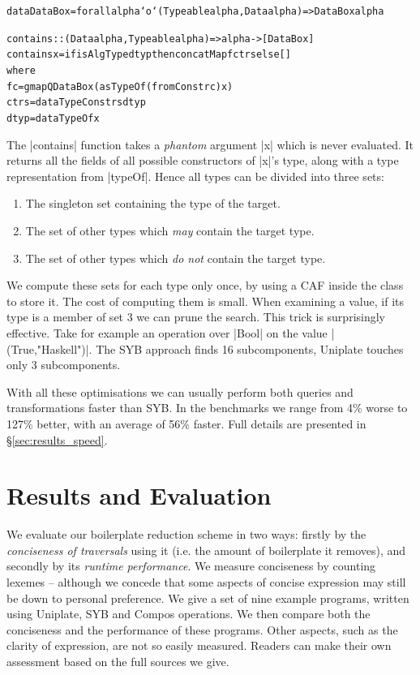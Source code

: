 \documentclass[preprint]{sigplanconf}
\newenvironment{code}{\begin{alltt}\small}{\end{alltt}}
\newcommand{\ignore}{}
\begin{document}
\ignore\begin{code}
data DataBox = forall alpha `o` (Typeable alpha, Data alpha) => DataBox alpha

contains :: (Data alpha, Typeable alpha) => alpha -> [DataBox]
contains x = if isAlgType dtyp then concatMap f ctrs else []
    where
        f c = gmapQ DataBox (asTypeOf (fromConstr c) x)
        ctrs = dataTypeConstrs dtyp
        dtyp = dataTypeOf x
\end{code}

The \ignore|contains| function takes a \textit{phantom} argument |x| which is never evaluated. It returns all the fields of all possible constructors of |x|'s type, along with a type representation from |typeOf|. Hence all types can be divided into three sets:

\begin{enumerate}
\item The singleton set containing the type of the target.
\item The set of other types which \textit{may} contain the target type.
\item The set of other types which \textit{do not} contain the target type.
\end{enumerate}

We compute these sets for each type only once, by using a CAF inside the class to store it. The cost of computing them is small. When examining a value, if its type is a member of set 3 we can prune the search. This trick is surprisingly effective. Take for example an operation over |Bool| on the value |(True,"Haskell")|. The SYB approach finds 16 subcomponents, Uniplate touches only 3 subcomponents.

With all these optimisations we can usually perform both queries and transformations faster than SYB. In the benchmarks we range from 4\% worse to 127\% better, with an average of 56\% faster. Full details are presented in \S\ref{sec:results_speed}.


\section{Results and Evaluation}
\label{sec:results}

We evaluate our boilerplate reduction scheme in two ways: firstly by the \textit{conciseness of traversals} using it (i.e. the amount of boilerplate it removes), and secondly by its \textit{runtime performance}. We measure conciseness by counting lexemes -- although we concede that some aspects of concise expression may still be down to personal preference. We give a set of nine example programs, written using Uniplate, SYB and Compos operations. We then compare both the conciseness and the performance of these programs. Other aspects, such as the clarity of expression, are not so easily measured. Readers can make their own assessment based on the full sources we give.
\end{document}
